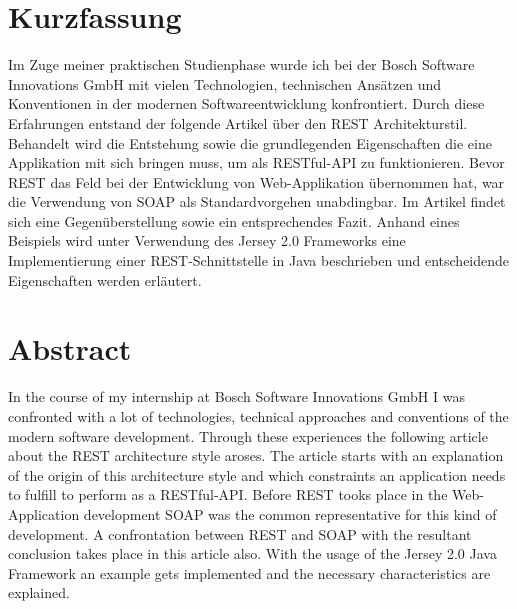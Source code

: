 \thispagestyle{empty}

\section*{Kurzfassung}
\label{cha:kurzfassung}
Im Zuge meiner praktischen Studienphase wurde ich bei der Bosch Software Innovations GmbH mit vielen Technologien, technischen Ansätzen und Konventionen in der modernen Softwareentwicklung konfrontiert. Durch diese Erfahrungen entstand der folgende Artikel über den REST Architekturstil. Behandelt wird die Entstehung sowie die grundlegenden Eigenschaften die eine Applikation mit sich bringen muss, um als RESTful-API zu funktionieren. Bevor REST das Feld bei der Entwicklung von Web-Applikation übernommen hat, war die Verwendung von SOAP als Standardvorgehen unabdingbar. Im Artikel findet sich eine Gegenüberstellung sowie ein entsprechendes Fazit. Anhand eines Beispiels wird unter Verwendung des Jersey 2.0 Frameworks eine Implementierung einer REST-Schnittstelle in Java beschrieben und entscheidende Eigenschaften werden erläutert.

\vspace{5em}
\renewcommand{\cleardoublepage}{}
\renewcommand{\clearpage}{}
\section*{Abstract}\label{cha:abtract}
In the course of my internship at Bosch Software Innovations GmbH I was confronted with a lot of technologies, technical approaches and conventions of the modern software development. Through these experiences the following article about the REST architecture style aroses. The article starts with an explanation of the origin of this architecture style and which constraints an application needs to fulfill to  perform as a RESTful-API. Before REST tooks place in the Web-Application development SOAP was the common representative for this kind of development. A confrontation between REST and SOAP with the resultant conclusion takes place in this article also. With the usage of the Jersey 2.0 Java Framework an example gets implemented and the necessary characteristics are explained. 
\vspace{10em}
